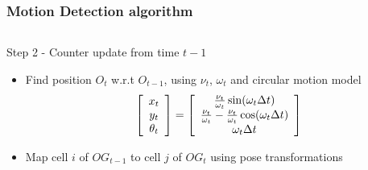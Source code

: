 \documentclass{beamer}
\begin{document}
	\begin{frame}
		\frametitle{Motion Detection algorithm}

		  \begin{columns}[t]
		  \begin{column}{5cm}
			\begin{block}{Step 2 - Counter update from time $t-1$}		  
			\begin{itemize}
			\item Find position $O_t$ w.r.t $O_{t-1}$, using $\nu_t$, $\omega_t$ and circular motion model
			\begin{equation}
			\left[\begin{array}{c}x_t \\ y_t\\ \theta_t \end{array} \right] = 
			\left[\begin{array}{c} {\nu_t \over \omega_t} \sin(\omega_t \Delta t) \\ {\nu_t \over \omega_t} - {\nu_t \over \omega_t} \cos(\omega_t \Delta t) \\ \omega_t \Delta t \end{array}\right]
			\label{eq:circularmotion}
			\end{equation}
			\item Map cell $i$ of $OG_{t-1}$ to cell $j$ of $OG_{t}$ using pose transformations
			\end{itemize}		
			\end{block}			
			

\end{column}
\end{columns}
\end{frame}
\end{document}
